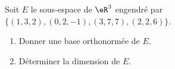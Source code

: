 

\begin{exercice}\label{exoMars20100004}

	Soit $E$ le sous-espace de $\eR^3$ engendré par $\{ (1,3,2),(0,2,-1),(3,7,7),(2,2,6) \}$.
	\begin{enumerate}

		\item
			Donner une base orthonormée de $E$.
		\item
			Déterminer la dimension de $E$.

	\end{enumerate}

\end{exercice}
